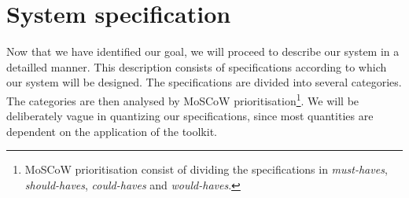 \documentclass[a4paper, openany, oneside]{memoir}
\begin{document}




\section{System specification}
\label{sec:theory-specs}
Now that we have identified our goal, we will proceed to describe our system in a detailled manner. This description consists of specifications according to which our system will be designed. The specifications are divided into several categories. The categories are then analysed by MoSCoW prioritisation\footnote{MoSCoW prioritisation consist of dividing the specifications in \textit{must-haves}, \textit{should-haves}, \textit{could-haves} and \textit{would-haves}.}. We will be deliberately vague in quantizing our specifications, since most quantities are dependent on the application of the toolkit.
\end{document}
